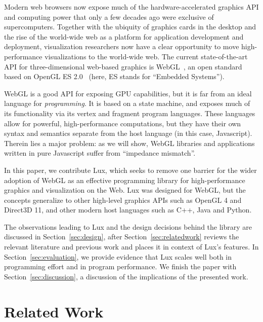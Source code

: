 Modern web browsers now expose much of the hardware-accelerated graphics API and computing power that only a few decades ago were exclusive of supercomputers.
Together with the ubiquity of graphics cards in the desktop and the rise of the world-wide web as a platform for application development and deployment, visualization researchers now have a clear opportunity to move high-performance visualizations to the world-wide web.
The current state-of-the-art API for three-dimensional web-based graphics is WebGL~\cite{webgl-spec}, an open standard based on OpenGL ES 2.0~\cite{opengles-spec} (here, ES stands for ``Embedded Systems'').

WebGL is a good API for exposing GPU capabilities, but it is far from an ideal language for \emph{programming}.
It is based on a state machine, and exposes much of its functionality via its vertex and fragment program languages. 
These languages allow for powerful, high-performance computations, but they have their own syntax and semantics separate from the host language (in this case, Javascript).
Therein lies a major problem: as we will show, WebGL libraries and applications written in pure Javascript suffer from ``impedance mismatch''.

In this paper, we contribute Lux, which seeks to remove one barrier for the wider adoption of WebGL as an effective programming library for high-performance graphics and visualization on the Web.
Lux was designed for WebGL, but the concepts generalize to other high-level graphics APIs such as OpenGL 4 and Direct3D 11, and other modern host languages such as C++, Java and Python. %

The observations leading to Lux and the design decisions behind the library are discussed in Section~\ref{sec:design}, after Section~\ref{sec:relatedwork} reviews the relevant literature and previous work and places it in context of Lux's features.
In Section~\ref{sec:evaluation}, we provide evidence that Lux scales well both in programming effort and in program performance.
We finish the paper with Section~\ref{sec:discussion}, a discussion of the implications of the presented work.

\section{Related Work\label{sec:relatedwork}}

